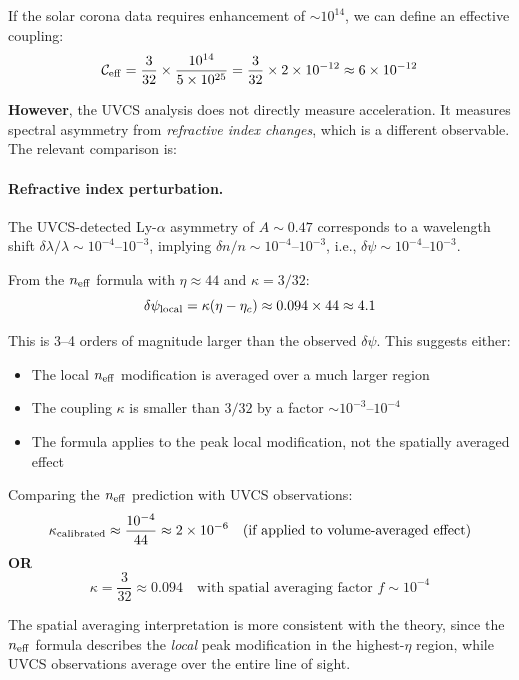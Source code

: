 \documentclass[12pt,a4paper]{article}
\begin{document}
If the solar corona data requires enhancement of $\sim 10^{14}$, we can define
an effective coupling:
\begin{equation}
\mathcal{C}_{\rm eff} = \frac{3}{32} \times \frac{10^{14}}{5 \times 10^{25}}
= \frac{3}{32} \times 2 \times 10^{-12} \approx 6 \times 10^{-12}
\end{equation}

\textbf{However}, the UVCS analysis does not directly measure acceleration.
It measures spectral asymmetry from \emph{refractive index changes}, which
is a different observable.  The relevant comparison is:

\paragraph{Refractive index perturbation.}
The UVCS-detected Ly-$\alpha$ asymmetry of $A \sim 0.47$ corresponds to
a wavelength shift $\delta\lambda/\lambda \sim 10^{-4}$--$10^{-3}$, implying
$\delta n/n \sim 10^{-4}$--$10^{-3}$, i.e., $\delta\psi \sim 10^{-4}$--$10^{-3}$.

From the $n_{\rm eff}$ formula with $\eta \approx 44$ and $\kappa = 3/32$:
\begin{equation}
\delta\psi_{\rm local} = \kappa(\eta - \eta_c) \approx 0.094 \times 44 \approx 4.1
\end{equation}

This is 3--4 orders of magnitude larger than the observed $\delta\psi$.
This suggests either:
\begin{itemize}
\item The local $n_{\rm eff}$ modification is averaged over a much larger region
\item The coupling $\kappa$ is smaller than $3/32$ by a factor $\sim 10^{-3}$--$10^{-4}$
\item The formula applies to the peak local modification, not the spatially averaged effect
\end{itemize}

\begin{tcolorbox}[colback=red!5!white, colframe=red!60!black,
  title=Solar Corona Calibration Result]
Comparing the $n_{\rm eff}$ prediction with UVCS observations:
\begin{equation}
\kappa_{\rm calibrated} \approx \frac{10^{-4}}{44} \approx 2 \times 10^{-6}
\quad \text{(if applied to volume-averaged effect)}
\end{equation}
\textbf{OR}
\begin{equation}
\kappa = \frac{3}{32} \approx 0.094
\quad \text{with spatial averaging factor } f \sim 10^{-4}
\end{equation}

The spatial averaging interpretation is more consistent with the theory,
since the $n_{\rm eff}$ formula describes the \emph{local} peak modification
in the highest-$\eta$ region, while UVCS observations average over the
entire line of sight.
\end{tcolorbox}
\end{document}
